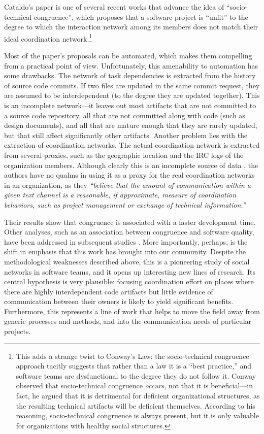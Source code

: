 Cataldo's paper is one of several recent works that advance the idea of ``socio-technical congruence'', which proposes that a software project is ``unfit'' to the degree to which the interaction network among its members does not match their ideal coordination network.\footnote{This adds a strange twist to Conway's Law: the socio-technical congruence approach tacitly suggests that rather than a law it is a ``best practice,'' and  software teams are dysfunctional to the degree they do not follow it. Conway observed that socio-technical congruence \emph{occurs}, not that it is beneficial---in fact, he argued that it is detrimental for deficient organizational structures, as the resulting technical artifacts will be deficient themselves. According to his reasoning, socio-technical congruence is always present, but it is only valuable for organizations with healthy social structures.}

Most of the paper's proposals can be automated, which makes them compelling from a practical point of view. Unfortunately, this amenability to automation has some drawbacks. The network of task dependencies is extracted from the history of source code commits. If two files are updated in the same commit request, they are assumed to be interdependent (to the degree they are updated together). This is an incomplete network---it leaves out most artifacts that are not committed to a source code repository, all that are not committed along with code (such as design documents), and all that are mature enough that they are rarely updated, but that still affect significantly other artifacts. Another problem lies with the extraction of coordination networks. The actual coordination network is extracted from several proxies, such as the geographic location and the IRC logs of the organization members. Although clearly this is an incomplete source of data \cite{Aranda2009}, the authors have no qualms in using it as a proxy for the real coordination networks in an organization, as they \emph{``believe that the amount of communication within a given text channel is a reasonable, if approximate, measure of coordination behaviors, such as project management or exchange of technical information.''}

Their results show that congruence is associated with a faster development time. Other analyses, such as an association between congruence and software quality, have been addressed in subsequent studies \cite{Cataldo2009}. More importantly, perhaps, is the shift in emphasis that this work has brought into our community. Despite the methodological weaknesses described above, this is a pioneering study of social networks in software teams, and it opens up interesting new lines of research. Its central hypothesis is very plausible: focusing coordination effort on places where there are highly interdependent code artifacts but little evidence of communication between their owners is likely to yield significant benefits. Furthermore, this represents a line of work that helps to move the field away from generic processes and methods, and into the communication needs of particular projects.

